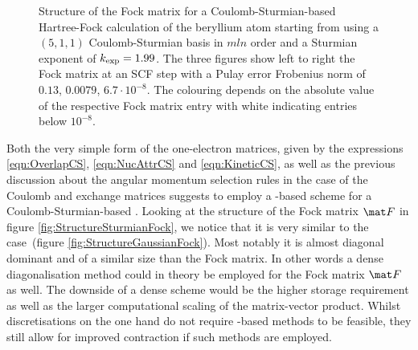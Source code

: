 \begin{figure}
	\centering
	\caption[Structure of the Fock matrix for a Coulomb-Sturmian-based
		Hartree-Fock]
		{Structure of the Fock matrix for a Coulomb-Sturmian-based
			Hartree-Fock calculation
		of the beryllium atom starting from using a $(5,1,1)$
		Coulomb-Sturmian basis in $mln$ order
		and a Sturmian exponent of $k_\text{exp} = 1.99$.
		The three figures show left to right the Fock matrix
		at an SCF step with a Pulay error Frobenius norm of
		$0.13$, $0.0079$, $6.7 \cdot 10^{-8}$.
		The colouring depends on the absolute value
		of the respective Fock matrix entry
		with white indicating entries below $10^{-8}$.
		}
	\label{fig:StructureSturmianFock}
\end{figure}
Both the very simple form of the one-electron matrices,
given by the expressions
\eqref{eqn:OverlapCS},
\eqref{eqn:NucAttrCS} and
\eqref{eqn:KineticCS},
as well as the previous discussion about the angular momentum selection
rules in the case of the Coulomb and exchange matrices
suggests to employ a \contraction-based scheme
for a Coulomb-Sturmian-based \SCF.
Looking at the structure of the Fock matrix $\matF$
in figure \vref{fig:StructureSturmianFock},
we notice that it is very similar to the \cGTO case~(figure \vref{fig:StructureGaussianFock}).
Most notably it is almost diagonal dominant and of a similar
size than the \cGTO Fock matrix.
In other words a dense diagonalisation method could in theory be employed
for the Fock matrix $\matF$ as well.
The downside of a dense scheme would be the higher
storage requirement as well as the larger
computational scaling of the matrix-vector product.
Whilst \CS discretisations on the one hand
do not require \contraction-based methods to be feasible,
they still allow for improved contraction if such methods are employed.

